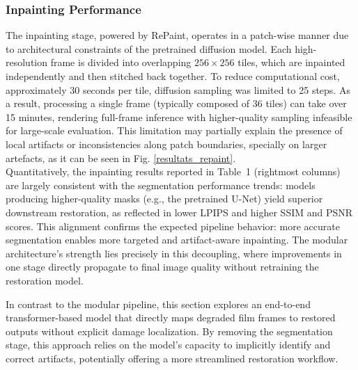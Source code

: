 \documentclass[10pt,a4paper,twocolumn,twoside]{article}
\begin{document}
\subsubsection{Inpainting Performance}
The inpainting stage, powered by RePaint, operates in a patch-wise manner due to architectural constraints of the pretrained diffusion model. Each high-resolution frame is divided into overlapping $256 \times 256$ tiles, which are inpainted independently and then stitched back together. To reduce computational cost, approximately 30 seconds per tile, diffusion sampling was limited to 25 steps. As a result, processing a single frame (typically composed of 36 tiles) can take over 15 minutes, rendering full-frame inference with higher-quality sampling infeasible for large-scale evaluation. This limitation may partially explain the presence of local artifacts or inconsistencies along patch boundaries, specially on larger artefacts, as it can be seen in Fig. \ref{resultats_repaint}.\\ 
Quantitatively, the inpainting results reported in Table~1 (rightmost columns) are largely consistent with the segmentation performance trends: models producing higher-quality masks (e.g., the pretrained U-Net) yield superior downstream restoration, as reflected in lower LPIPS and higher SSIM and PSNR scores. This alignment confirms the expected pipeline behavior: more accurate segmentation enables more targeted and artifact-aware inpainting. The modular architecture's strength lies precisely in this decoupling, where improvements in one stage directly propagate to final image quality without retraining the restoration model.


In contrast to the modular pipeline, this section explores an end-to-end transformer-based model that directly maps degraded film frames to restored outputs without explicit damage localization. By removing the segmentation stage, this approach relies on the model’s capacity to implicitly identify and correct artifacts, potentially offering a more streamlined restoration workflow.
\end{document}
